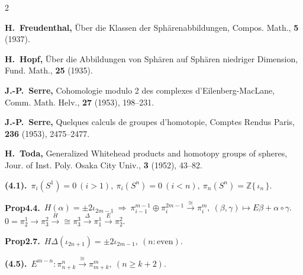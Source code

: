 \documentclass[10pt, leqno]{ltjsarticle}
\newcommand{\gen}[1]{\{\,#1\,\}}       %
\newcommand{\pis}[2]{\pi_{#1}(#2)}       %
\newcommand{\pit}[2]{\pi_{#1}^{#2}}
\newcommand{\z}{\mathbb{Z}}
\numberwithin{equation}{section}
\theoremstyle{plain}
\theoremstyle{definition}
\theoremstyle{remark}
\begin{document}
\begin{paracol}{2}
\switchcolumn

\noindent
\textbf{\cite{Freudenthal1937}
H.~Freudenthal,}
\newblock Über die Klassen der Sphärenabbildungen,
\newblock Compos. Math., {\bf 5} (1937).

\noindent
\textbf{\cite{Hopf1935}
H.~Hopf,}
\newblock Über die Abbildungen von Sphären auf Sphären niedriger Dimension,
\newblock Fund. Math., {\bf 25} (1935).

\noindent
\textbf{\cite{Serre1953a}
J.-P.~Serre,}
\newblock Cohomologie modulo 2 des complexes d'Eilenberg-MacLane,
\newblock Comm. Math. Helv., {\bf 27} (1953), 198--231.

\noindent
\textbf{\cite{Serre1953c}
J.-P.~Serre,}
\newblock Quelques calculs de groupes d'homotopie,
\newblock Comptes Rendus Paris, {\bf 236} (1953), 2475--2477.

\noindent
\textbf{\cite{Toda1952}
H.~Toda,}
\newblock Generalized Whitehead products and homotopy groups of spheres,
\newblock Jour. of Inst. Poly. Osaka City Univ., {\bf 3} (1952), 43--82.

\noindent
\textbf{(4.1).}\
\(\pis{i}{S^1} = 0\ (i>1),\
\pis{i}{S^n} = 0\ (i < n),\
\pis{n}{S^n} = \z\gen{\iota_n}. \)

\noindent
\textbf{Prop4.4.}\
\(H(\alpha) = \pm 2\iota_{2m-1}\ \Longrightarrow\
\pit{i-1}{m-1}\oplus\pit{i}{2m-1}\xrightarrow{\cong}\pit{i}{m},\
(\beta,\gamma)\mapsto E\beta+\alpha\circ\gamma.\)\\
\(0=\pit{2}{1}\to\pit{3}{2}
\xrightarrow{H}{\cong}\pit{3}{3}
\xrightarrow{\Delta}\pit{1}{1}
\xrightarrow{E}\pit{2}{2}.\)

\noindent
\textbf{Prop2.7.}\
\(H\Delta(\iota_{2n+1}) = \pm2\iota_{2m-1},\ (n:\text{even})\).

\noindent
\textbf{(4.5).}\
\(E^{m-n}:\pit{n+k}{n}\xrightarrow{\cong}\pit{m+k}{m},\
(n\ge k+2). \)


\end{paracol}
\end{document}
